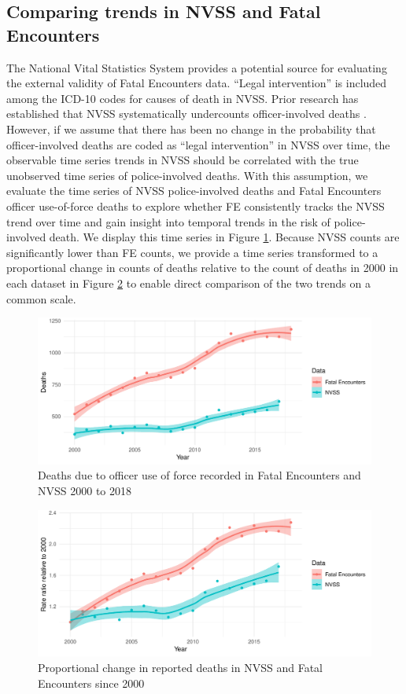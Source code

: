 \documentclass{article}
\begin{document}
\subsection*{Comparing trends in NVSS and Fatal Encounters}

The National Vital Statistics System provides a potential source for evaluating the external validity of Fatal Encounters data. ``Legal intervention'' is included among the ICD-10 codes for causes of death in NVSS. Prior research has established that NVSS systematically undercounts officer-involved deaths \cite{Feldman2017Quantifying}. However, if we assume that there has been no change in the probability that officer-involved deaths are coded as ``legal intervention'' in NVSS over time, the observable time series trends in NVSS should be correlated with the true unobserved time series of police-involved deaths. With this assumption, we evaluate the time series of NVSS police-involved deaths and Fatal Encounters officer use-of-force deaths to explore whether FE consistently tracks the NVSS trend over time and gain insight into temporal trends in the risk of police-involved death. We display this time series in Figure \ref{fig:countTS}. Because NVSS counts are significantly lower than FE counts, we provide a time series transformed to a proportional change in counts of deaths relative to the count of deaths in 2000 in each dataset in Figure \ref{fig:pctTS} to enable direct comparison of the two trends on a common scale. 

\begin{figure}
	\centering
	\includegraphics[width = \linewidth]{vis/nvss_fe_ts.pdf}
	\caption{Deaths due to officer use of force recorded in Fatal Encounters and NVSS 2000 to 2018}
	\label{fig:countTS}
\end{figure}

\begin{figure}
	\centering
	\includegraphics[width = \linewidth]{vis/nvss_fe_pct.pdf}
	\caption{Proportional change in reported deaths in NVSS and Fatal Encounters since 2000}
	\label{fig:pctTS}
\end{figure}
\end{document}
